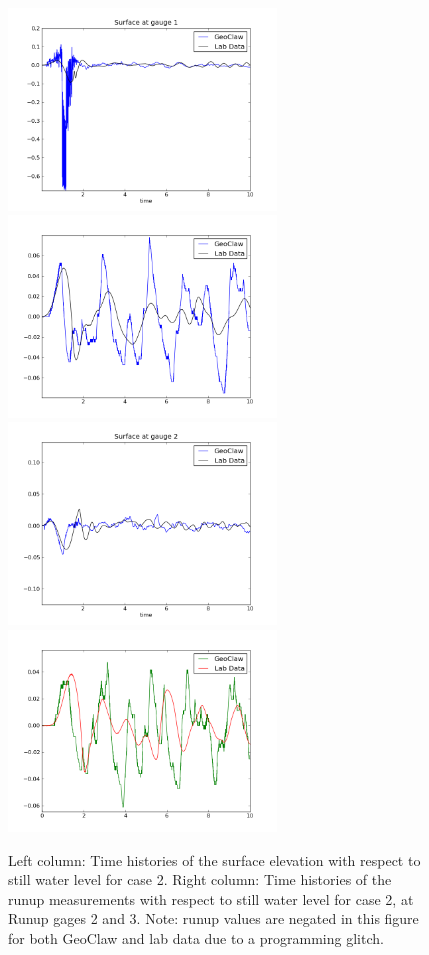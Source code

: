 \begin{figure}[ht]
\hfil\includegraphics[width=2.8in]{bp12/case2wavegauge1.png}\hfil
\hfil\includegraphics[width=2.8in]{bp12/case2runupgauge2.png}\hfil
\vskip 5pt
\hfil\includegraphics[width=2.8in]{bp12/case2wavegauge2.png}\hfil
\hfil\includegraphics[width=2.8in]{bp12/case2runupgauge3.png}\hfil
\caption{\label{fig:bp8gauges2}
Left column: Time histories of the surface elevation with respect to still
water level for case 2.
Right column: Time histories of the runup measurements with respect
to still water level for case 2, at Runup gages 2 and 3.  Note: runup
values are negated in this figure for both GeoClaw and lab data due to
a programming glitch.
  }
\end{figure}


